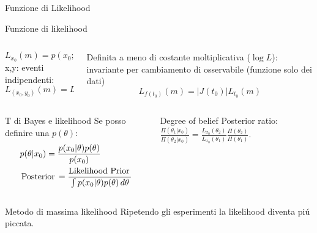 \documentclass[asd-beamer.tex]{subfiles}%
\begin{document}
\begin{frame}{Funzione di Likelihood}\frameintoc
\begin{block}{Funzione di likelihood}
\begin{columns}[T]
	\begin{column}{0.5\textwidth}
		\[L_{x_0}(m)=p(x_0;m)\]
		x,y: eventi indipendenti:
		\[L_{(x_0,y_0)}(m)=L_{x_0}(m)L_{y_0}(m)\]
	\end{column}
	\begin{column}{0.5\textwidth}
		Definita a meno di costante moltiplicativa ($\log{L}$): invariante per cambiamento di osservabile (funzione solo dei dati)
		\[L_{f(t_0)}(m)=|J(t_0)|L_{t_0}(m)\]
	\end{column}
\end{columns}
\end{block}
\begin{columns}[T]
\begin{column}{0.5\textwidth}
	\begin{block}{T di Bayes e likelihood}
		Se posso definire una $p(\theta)$:
		\begin{align*}
		&p(\theta|x_0)=\frac{p(x_0|\theta)p(\theta)}{p(x_0)}\\
		&\operatorname{Posterior}{}=\frac{\operatorname{Likelihood}{}\operatorname{Prior}{}}{\int p(x_0|\theta)p(\theta)\,d\theta}
		\end{align*}
	\end{block}
\end{column}
\begin{column}{0.5\textwidth}
	\begin{block}{Degree of belief}
		Posterior ratio: $\frac{\Pi(\theta_1|x_0)}{\Pi(\theta_2|x_0)}=\frac{L_{x_0}(\theta_2)}{L_{x_0}(\theta_1)}\frac{\Pi(\theta_2)}{\Pi(\theta_1)}$.
	\end{block}
\end{column}
\end{columns}
\begin{block}{Metodo di massima likelihood}
Ripetendo gli esperimenti la likelihood diventa pi\'u piccata.
\end{block}
\end{frame}
\end{document}
